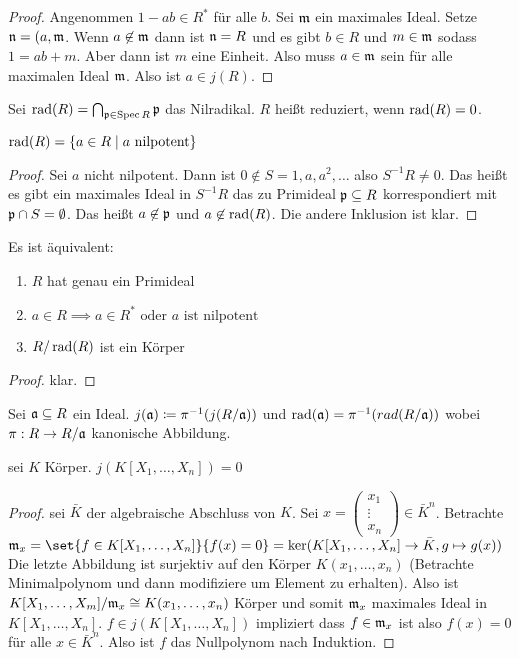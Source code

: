 \begin{proof}
    Angenommen $1-ab\in R^{*}$ für alle $b$. Sei $\mathfrak{m}$ ein maximales Ideal. Setze $\mathfrak{n}=(a,\mathfrak{m}$. Wenn $a\not\in\mathfrak{m}$ dann ist $\mathfrak{n}=R$ und es gibt $b\in R$ und $m\in\mathfrak{m}$ sodass $1=ab+m$. Aber dann ist $m$ eine Einheit. Also muss $a\in\mathfrak{m}$ sein für alle maximalen Ideal $\mathfrak{m}$. Also ist $a\in j(R)$.
\end{proof}
\begin{Def}
    Sei $\operatorname{rad}(R)=\bigcap_{\mathfrak{p}\in \operatorname{Spec} R}\mathfrak{p}$ das Nilradikal. $R$ heißt reduziert, wenn $\operatorname{rad}(R)=0$.
\end{Def}
\begin{Satz}
    $\operatorname{rad}(R)=\{a\in R\mid a \text{ nilpotent}\}$
\end{Satz}
\begin{proof}
    Sei $a$ nicht nilpotent. Dann ist $0\not\in S={1,a,a^2,\dots}$ also $S^{-1}R\neq 0$.
    Das heißt es gibt ein maximales Ideal in $S^{-1}R$ das zu Primideal $\mathfrak{p}\subseteq R$ korrespondiert mit $\mathfrak{p}\cap S=\emptyset$.
    Das heißt $a\not\in\mathfrak{p}$ und $a\not\in \operatorname{rad}(R)$. Die andere Inklusion ist klar.
\end{proof}
\begin{Lemma}
    Es ist äquivalent:
    \begin{enumerate}
        \item $R$ hat genau ein Primideal
        \item $a\in R\implies a\in R^* \text{ oder $a$ ist nilpotent}$
        \item $R/\operatorname{rad}(R)$ ist ein Körper
    \end{enumerate}
\end{Lemma}
\begin{proof}
    klar.
\end{proof}
\begin{Def}
    Sei $\mathfrak{a}\subseteq R$ ein Ideal. $j(\mathfrak{a})\coloneq \pi^{-1}(j(R/\mathfrak{a}))$ und $\operatorname{rad}(\mathfrak{a})=\pi^{-1}(rad(R/\mathfrak{a}))$ wobei $\pi:R\to R/\mathfrak{a}$ kanonische Abbildung.
\end{Def}
\begin{Satz}
    sei $K$ Körper. $j(K[X_1,\dots,X_n])=0$
\end{Satz}
\begin{proof}
    sei $\bar K$ der algebraische Abschluss von $K$.
    Sei $x=\begin{pmatrix}
        x_1\\ \vdots\\ x_n
    \end{pmatrix}\in \bar K^n$. Betrachte 
    $\frakm_x=\set{f\in K[X_1,\dots,X_n]}{f(x)=0}=\ker(K[X_1,\dots,X_n]\to\bar K, g\mapsto g(x))$
    Die letzte Abbildung ist surjektiv auf den Körper $K(x_1,\dots,x_n)$ (Betrachte Minimalpolynom und dann modifiziere um Element zu erhalten).
    Also ist $K[X_1,\dots,X_m]/\mathfrak{m}_x\cong K(x_1,\dots,x_n)$ Körper und somit $\mathfrak{m}_x$ maximales Ideal in $K[X_1,\dots,X_n]$.
    $f\in j(K[X_1,\dots,X_n])$ impliziert dass $f\in\mathfrak{m}_x$ ist also $f(x)=0$ für alle $x\in\bar K^{n}$. Also ist $f$ das Nullpolynom nach Induktion.
\end{proof}
